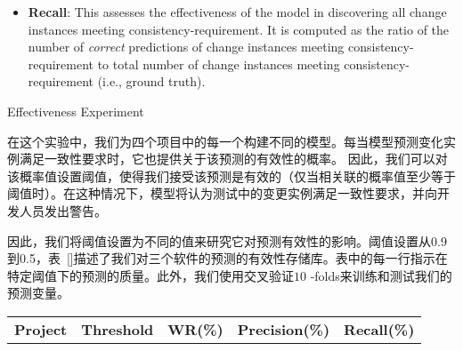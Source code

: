 {\begin{itemize}
\item \textbf{Recall}: 
This assesses the effectiveness of the model in discovering all change instances meeting consistency-requirement.
It is computed as the ratio of the number of {\em correct} predictions of change instances meeting consistency-requirement to total number of change instances meeting consistency-requirement (i.e., ground truth).
\end{itemize}

{Effectiveness Experiment}

在这个实验中，我们为四个项目中的每一个构建不同的模型。每当模型预测变化实例满足一致性要求时，它也提供关于该预测的有效性的概率。 因此，我们可以对该概率值设置阈值，使得我们接受该预测是有效的（仅当相关联的概率值至少等于阈值时）。在这种情况下，模型将认为测试中的变更实例满足一致性要求，并向开发人员发出警告。

因此，我们将阈值设置为不同的值来研究它对预测有效性的影响。阈值设置从0.9到0.5，表~\ref{}描述了我们对三个软件的预测的有效性存储库。表中的每一行指示在特定阈值下的预测的质量。此外，我们使用交叉验证$ 10 $ -folds来训练和测试我们的预测变量。

\begin{table}[htbp]
\vspace{0.5em}\centering\wuhao
\begin{tabular}{ccccc}
\toprule[1.5pt]
\textbf{Project}&\textbf{Threshold}&\textbf{WR(\%)}&\textbf{Precision(\%)}&\textbf{Recall(\%)}\\


\end{tabular}
\end{table}}
